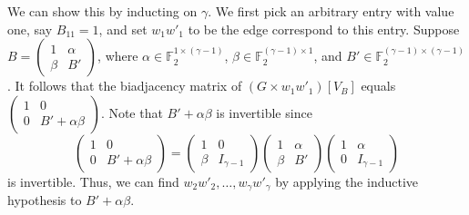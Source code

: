 \documentclass[reqno]{amsart}
\theoremstyle{definition}
\numberwithin{theorem}{section}
\newcommand{\FF}{\mathbb F}
\begin{document}
We can show this by inducting on $\gamma$.
We first pick an arbitrary entry with value one, say $B_{11}=1$, and set $w_1w'_1$ to be the edge correspond to this entry. Suppose $B=\begin{pmatrix}
    1&\alpha\\
    \beta &B'
\end{pmatrix}$, where $\alpha\in \FF_2^{1\times (\gamma-1)}$, $\beta\in \FF_2^{(\gamma-1)\times 1}$, and $B'\in \FF_2^{(\gamma-1)\times (\gamma-1)}$. It follows that the biadjacency matrix of $(G\times w_1w'_1)[V_B]$ equals
$\begin{pmatrix}
    1&0\\
    0 &B'+\alpha\beta
\end{pmatrix}$. Note that $B'+\alpha\beta$ is invertible since 
\[\begin{pmatrix}
    1&0\\
    0 &B'+\alpha\beta
\end{pmatrix}=\begin{pmatrix}
    1&0\\
    \beta &I_{\gamma-1}
\end{pmatrix}\begin{pmatrix}
    1&\alpha\\
    \beta &B'
\end{pmatrix}\begin{pmatrix}
    1&\alpha\\
    0 &I_{\gamma-1}
\end{pmatrix}\]
is invertible. Thus, we can find $w_2w'_2,\dots,w_\gamma w'_\gamma$ by applying the inductive hypothesis to $B'+\alpha\beta$.
\end{document}
